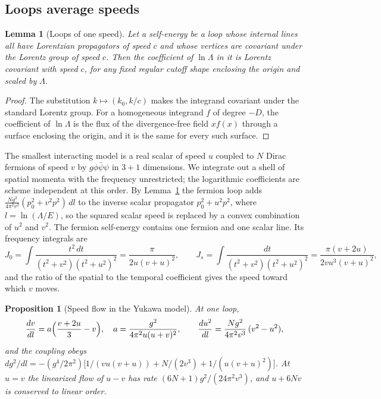 \documentclass[12pt]{article}
\newtheorem{lemma}[theorem]{Lemma}
\newtheorem{proposition}[theorem]{Proposition}
\theoremstyle{definition}
\theoremstyle{remark}
\begin{document}
\subsection{Loops average speeds}

\begin{lemma}[Loops of one speed]
\label{lem:onespeed}
Let a self-energy be a loop whose internal lines all have Lorentzian propagators of speed $c$ and whose vertices are covariant under the Lorentz group of speed $c$. Then the coefficient of $\ln\Lambda$ in it is Lorentz covariant with speed $c$, for any fixed regular cutoff shape enclosing the origin and scaled by $\Lambda$.
\end{lemma}

\begin{proof}
The substitution $k\mapsto(k_0,k/c)$ makes the integrand covariant under the standard Lorentz group. For a homogeneous integrand $f$ of degree $-D$, the coefficient of $\ln\Lambda$ is the flux of the divergence-free field $x f(x)$ through a surface enclosing the origin, and it is the same for every such surface.
\end{proof}

The smallest interacting model is a real scalar of speed $u$ coupled to $N$ Dirac fermions of speed $v$ by $g\phi\bar\psi\psi$ in $3+1$ dimensions. We integrate out a shell of spatial momenta with the frequency unrestricted; the logarithmic coefficients are scheme independent at this order. By Lemma~\ref{lem:onespeed} the fermion loop adds $\frac{Ng^2}{4\pi^2v^3}(p_0^2+v^2p^2)\,dl$ to the inverse scalar propagator $p_0^2+u^2p^2$, where $l=\ln(\Lambda/E)$, so the squared scalar speed is replaced by a convex combination of $u^2$ and $v^2$. The fermion self-energy contains one fermion and one scalar line. Its frequency integrals are
\begin{equation}
J_0=\int\frac{t^2\,dt}{(t^2+v^2)(t^2+u^2)^2}=\frac{\pi}{2u(v+u)^2},\qquad
J_s=\int\frac{dt}{(t^2+v^2)(t^2+u^2)^2}=\frac{\pi(v+2u)}{2vu^3(v+u)^2},
\end{equation}
and the ratio of the spatial to the temporal coefficient gives the speed toward which $v$ moves.

\begin{proposition}[Speed flow in the Yukawa model]
\label{prop:yukawa}
At one loop,
\begin{equation}
\frac{dv}{dl}=a\Bigl(\frac{v+2u}{3}-v\Bigr),\quad a=\frac{g^2}{4\pi^2u(u+v)^2},\qquad
\frac{du^2}{dl}=\frac{Ng^2}{4\pi^2v^3}\,(v^2-u^2),
\label{eq:yukawa-flow}
\end{equation}
and the coupling obeys $dg^2/dl=-(g^4/2\pi^2)\bigl[1/(vu(v+u))+N/(2v^3)+1/(u(v+u)^2)\bigr]$. At $u=v$ the linearized flow of $u-v$ has rate $(6N+1)g^2/(24\pi^2v^3)$, and $u+6Nv$ is conserved to linear order.
\end{proposition}
\end{document}
